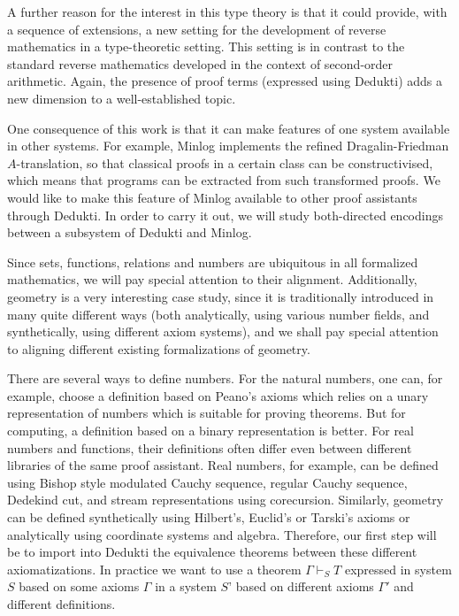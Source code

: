 A further reason for the interest in this type theory is that it could
provide, with a sequence of extensions, a new setting for the
development of reverse mathematics in a type-theoretic setting. This
setting is in contrast to the standard reverse mathematics developed
in the context of second-order arithmetic. Again, the presence of
proof terms (expressed using Dedukti) adds a new dimension to a
well-established topic.

One consequence of this work is that it can make features of one
system available in other systems. For example, Minlog implements the
refined Dragalin-Friedman $A$-translation, so that classical proofs in
a certain class can be constructivised, which means that programs can
be extracted from such transformed proofs.  We would like to make this
feature of Minlog available to other proof assistants through Dedukti.
In order to carry it out, we will study both-directed encodings
between a subsystem of Dedukti and Minlog.

Since sets, functions, relations and numbers are ubiquitous in all
formalized mathematics, we will pay special attention to their
alignment. Additionally, geometry is a very interesting case study,
since it is traditionally introduced in many quite different ways
(both analytically, using various number fields, and synthetically,
using different axiom systems), and we shall pay special attention
to aligning different existing formalizations of geometry.

There are several ways to define numbers. For the natural numbers,
one can, for example, choose a definition based on Peano’s axioms which
relies on a unary representation of numbers which is suitable for
proving theorems. But for computing, a definition based on a binary
representation is better. For real numbers and functions, their
definitions often differ even between different libraries of the same
proof assistant.  Real numbers, for example, can be defined using 
Bishop style modulated Cauchy sequence, regular Cauchy sequence,
Dedekind cut, and stream representations using corecursion.
Similarly, geometry can be defined synthetically using Hilbert’s,
Euclid’s or Tarski’s axioms or analytically using coordinate systems and
algebra.  Therefore, our first step will be to import into Dedukti the
equivalence theorems between these different axiomatizations. In
practice we want to use a theorem $\Gamma \vdash_S T$ expressed in
system $S$ based on some axioms $\Gamma$ in a system $S’$ based on
different axioms $\Gamma'$ and different definitions.

